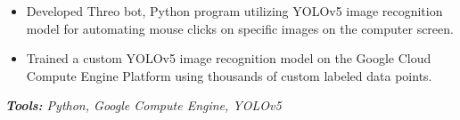 \documentclass[10pt,letter]{altacv}
\begin{document}
\divider

\begin{itemize}
  \item Developed Threo bot, Python program utilizing YOLOv5 image recognition model for automating mouse clicks on specific images on the computer screen.
  \item Trained a custom YOLOv5 image recognition model on the Google Cloud Compute Engine Platform using thousands of custom labeled data points.
\end{itemize}
\textit{\textbf{Tools:} Python, Google Compute Engine, YOLOv5}



\end{document}
